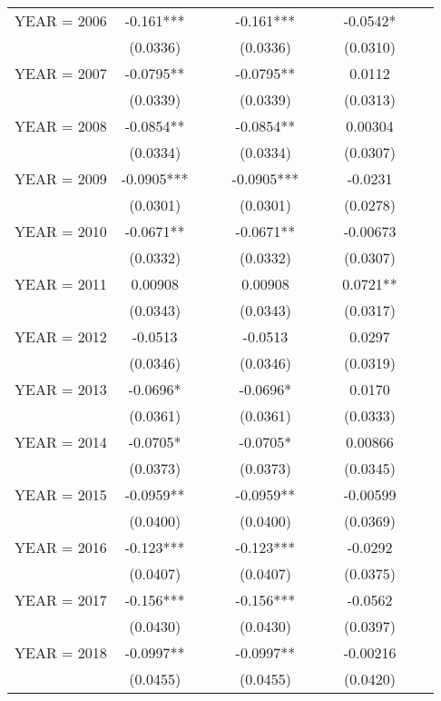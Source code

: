 \begin{tabular}{lccccccccc}
YEAR = 2006 & -0.161*** &  &  & -0.161*** &  &  & -0.0542* &  &  \\
 & (0.0336) &  &  & (0.0336) &  &  & (0.0310) &  &  \\
YEAR = 2007 & -0.0795** &  &  & -0.0795** &  &  & 0.0112 &  &  \\
 & (0.0339) &  &  & (0.0339) &  &  & (0.0313) &  &  \\
YEAR = 2008 & -0.0854** &  &  & -0.0854** &  &  & 0.00304 &  &  \\
 & (0.0334) &  &  & (0.0334) &  &  & (0.0307) &  &  \\
YEAR = 2009 & -0.0905*** &  &  & -0.0905*** &  &  & -0.0231 &  &  \\
 & (0.0301) &  &  & (0.0301) &  &  & (0.0278) &  &  \\
YEAR = 2010 & -0.0671** &  &  & -0.0671** &  &  & -0.00673 &  &  \\
 & (0.0332) &  &  & (0.0332) &  &  & (0.0307) &  &  \\
YEAR = 2011 & 0.00908 &  &  & 0.00908 &  &  & 0.0721** &  &  \\
 & (0.0343) &  &  & (0.0343) &  &  & (0.0317) &  &  \\
YEAR = 2012 & -0.0513 &  &  & -0.0513 &  &  & 0.0297 &  &  \\
 & (0.0346) &  &  & (0.0346) &  &  & (0.0319) &  &  \\
YEAR = 2013 & -0.0696* &  &  & -0.0696* &  &  & 0.0170 &  &  \\
 & (0.0361) &  &  & (0.0361) &  &  & (0.0333) &  &  \\
YEAR = 2014 & -0.0705* &  &  & -0.0705* &  &  & 0.00866 &  &  \\
 & (0.0373) &  &  & (0.0373) &  &  & (0.0345) &  &  \\
YEAR = 2015 & -0.0959** &  &  & -0.0959** &  &  & -0.00599 &  &  \\
 & (0.0400) &  &  & (0.0400) &  &  & (0.0369) &  &  \\
YEAR = 2016 & -0.123*** &  &  & -0.123*** &  &  & -0.0292 &  &  \\
 & (0.0407) &  &  & (0.0407) &  &  & (0.0375) &  &  \\
YEAR = 2017 & -0.156*** &  &  & -0.156*** &  &  & -0.0562 &  &  \\
 & (0.0430) &  &  & (0.0430) &  &  & (0.0397) &  &  \\
YEAR = 2018 & -0.0997** &  &  & -0.0997** &  &  & -0.00216 &  &  \\
 & (0.0455) &  &  & (0.0455) &  &  & (0.0420) &  &  \\

\end{tabular}
